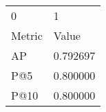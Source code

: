 \begin{tabular}{ll}
0 & 1 \\
Metric & Value \\
AP & 0.792697 \\
P@5 & 0.800000 \\
P@10 & 0.800000 \\
\end{tabular}

